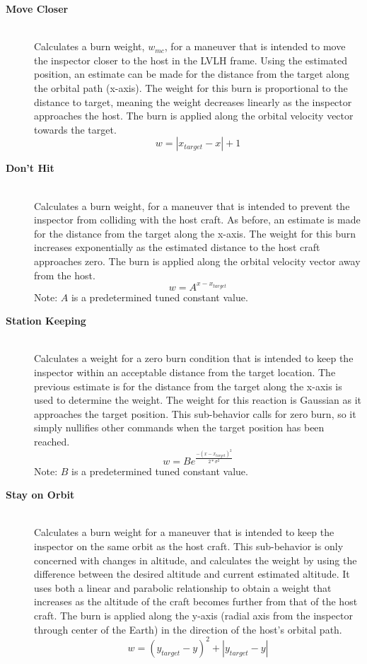 \documentclass[journal, 10pt]{IEEEtran}
\begin{document}
\begin{description}
\item[\textbf{Move Closer}] \hfill \\
Calculates a burn weight, $w_{mc}$, for a maneuver that is intended to move the inspector closer to the host in the LVLH frame.  Using the estimated position, an estimate can be made for the distance from the target along the orbital path (x-axis).  The weight for this burn is proportional to the distance to target, meaning the weight decreases linearly as the inspector approaches the host.  The burn is applied along the orbital velocity vector towards the target.
\begin{equation}
w = |x_{target}-x|+1
\end{equation}

\item[\textbf{Don't Hit}] \hfill \\
Calculates a burn weight, for a maneuver that is intended to prevent the inspector from colliding with the host craft.  As before, an estimate is made for the distance from the target along the x-axis.  The weight for this burn increases exponentially as the estimated distance to the host craft approaches zero.  The burn is applied along the orbital velocity vector away from the host.
\begin{equation}
w = A^{x-x_{target}}
\end{equation}
Note: $A$ is a predetermined tuned constant value.

\item[\textbf{Station Keeping}] \hfill \\
Calculates a weight for a zero burn condition that is intended to keep the inspector within an acceptable distance from the target location.  The previous estimate is for the distance from the target along the x-axis is used to determine the weight.  The weight for this reaction is Gaussian as it approaches the target position.  This sub-behavior calls for zero burn, so it simply nullifies other commands when the target position has been reached.
\begin{equation}
w = Be^{\frac{-(x-x_{target})^2}{2*\sigma^2}}
\end{equation}
Note: $B$ is a predetermined tuned constant value. \\

\item[\textbf{Stay on Orbit}] \hfill \\
Calculates a burn weight for a maneuver that is intended to keep the inspector on the same orbit as the host craft.  This sub-behavior is only concerned with changes in altitude, and calculates the weight by using the difference between the desired altitude and current estimated altitude.  It uses both a linear and parabolic relationship to obtain a weight that increases as the altitude of the craft becomes further from that of the host craft.  The burn is applied along the y-axis (radial axis from the inspector through center of the Earth) in the direction of the host's orbital path.
\begin{equation}
w = (y_{target}-y)^2+|y_{target}-y|
\end{equation}


\end{description}
\end{document}
